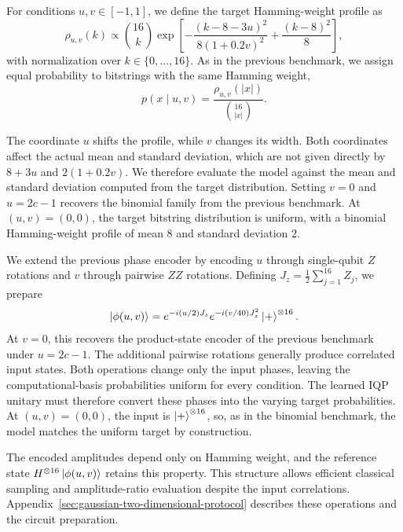 \documentclass[pra,aps,10pt,twocolumn,floatfix,superscriptaddress, notitlepage,longbibliography]{revtex4-2}
\begin{document}
For conditions $u,v\in[-1,1]$, we define the target Hamming-weight profile as
\begin{equation}
    \rho_{u,v}(k)\propto\binom{16}{k}
    \exp\!\left[-\frac{(k-8-3u)^2}{8(1+0.2v)^2}
    +\frac{(k-8)^2}{8}\right],
\end{equation}
with normalization over $k\in\{0,\ldots,16\}$. As in the previous benchmark, we assign equal probability to bitstrings with the same Hamming weight,
\begin{equation}
    p(x\mid u,v)=\frac{\rho_{u,v}(|x|)}{\binom{16}{|x|}}.
    \label{eq:gaussian-two-dimensional-target}
\end{equation}

The coordinate $u$ shifts the profile, while $v$ changes its width. Both coordinates affect the actual mean and standard deviation, which are not given directly by $8+3u$ and $2(1+0.2v)$. We therefore evaluate the model against the mean and standard deviation computed from the target distribution. Setting $v=0$ and $u=2c-1$ recovers the binomial family from the previous benchmark. At $(u,v)=(0,0)$, the target bitstring distribution is uniform, with a binomial Hamming-weight profile of mean $8$ and standard deviation $2$.

We extend the previous phase encoder by encoding $u$ through single-qubit $Z$ rotations and $v$ through pairwise $ZZ$ rotations. Defining $J_z=\tfrac12\sum_{j=1}^{16}Z_j$, we prepare
\begin{equation}
    \ket{\phi(u,v)}
    =e^{-i(u/2)J_z}e^{-i(v/40)J_z^2}
    \ket{+}^{\otimes16}.
    \label{eq:gaussian-two-dimensional-input}
\end{equation}
At $v=0$, this recovers the product-state encoder of the previous benchmark under $u=2c-1$. The additional pairwise rotations generally produce correlated input states. Both operations change only the input phases, leaving the computational-basis probabilities uniform for every condition. The learned IQP unitary must therefore convert these phases into the varying target probabilities. At $(u,v)=(0,0)$, the input is $\ket{+}^{\otimes16}$, so, as in the binomial benchmark, the model matches the uniform target by construction.

The encoded amplitudes depend only on Hamming weight, and the reference state $H^{\otimes16}\ket{\phi(u,v)}$ retains this property. This structure allows efficient classical sampling and amplitude-ratio evaluation despite the input correlations. Appendix~\ref{sec:gaussian-two-dimensional-protocol} describes these operations and the circuit preparation.
\end{document}
